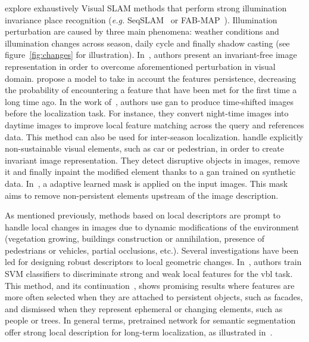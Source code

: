 			\citet[Section VII]{Lowry2016} explore exhaustively Visual SLAM methods that perform strong illumination invariance place recognition (\textit{e.g.} SeqSLAM~\citep{Milford2012,Pepperell2014,Pepperell2016} or FAB-MAP~\citep{Cummins2008,Cummins2010,Paul2010}). Illumination perturbation are caused by three main phenomena: weather conditions and illumination changes across season, daily cycle and finally shadow casting (see figure~\ref{fig:changes} for illustration). In~\citep{Lowry2016a}, authors present an invariant-free image representation in order to overcome aforementioned perturbation in visual domain. \citet{Rosen2016} propose a model to take in account the features persistence, decreasing the probability of encountering a feature that have been met for the first time a long time ago. In the work of~\citet{Porav2018}, authors use \ac{gan} to produce time-shifted images before the localization task. For instance, they convert night-time images into daytime images to improve local feature matching across the query and references data. This method can also be used for inter-season localization. \citet{Bescos2019} handle explicitly non-sustainable visual elements, such as car or pedestrian, in order to create invariant image representation. They detect disruptive objects in images, remove it and finally inpaint the modified element thanks to a \ac{gan} trained on synthetic data. In~\citep{Naseer2017a}, a adaptive learned mask is applied on the input images. This mask aims to remove non-persistent elements upstream of the image description.
			
			As mentioned previously, methods based on local descriptors are prompt to handle local changes in images due to dynamic modifications of the environment (\eg vegetation growing, buildings construction or annihilation, presence of pedestrians or vehicles, partial occlusions, etc.). Several investigations have been led for designing robust descriptors to local geometric changes. In~\citep{Kim2015,Linegar2016}, authors train SVM classifiers to discriminate strong and weak local features for the \ac{vbl} task. This method, and its continuation~\citep{Kim2017}, shows promising results where features are more often selected when they are attached to persistent objects, such as facades, and dismissed when they represent ephemeral or changing elements, such as people or trees. In general terms, pretrained network for semantic segmentation offer strong local description for long-term localization, as illustrated in~\citep{Mousavian2015,Garg2018a,Toft2018,Shi2019,Schonberger2017a}.
			

